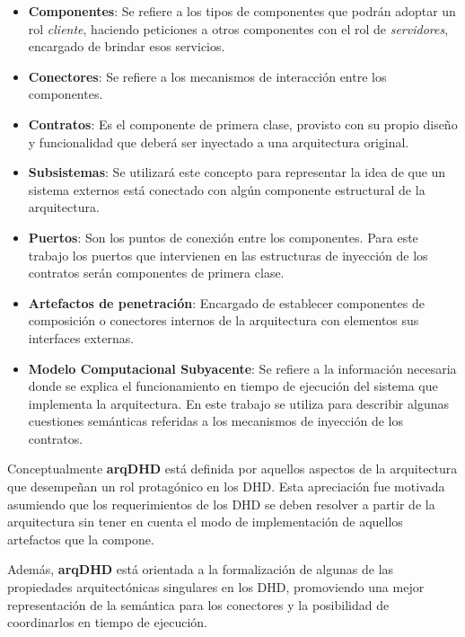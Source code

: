 \begin{itemize}
 
 \item \textbf{Componentes}: Se refiere a los tipos de componentes que podrán adoptar un rol 
 \textit{cliente}, haciendo peticiones a otros componentes con el rol de \textit{servidores}, encargado de brindar esos servicios. \label{lbl:componente} 
 
 
 \item \textbf{Conectores}: Se refiere a los mecanismos de interacción entre los componentes.
 
 \item \textbf{Contratos}: Es el componente de primera clase, provisto con su propio diseño y funcionalidad que deberá ser inyectado a una arquitectura original.
 
 \item \textbf{Subsistemas}: Se utilizará este concepto para representar la idea de que un sistema externos está conectado con algún componente estructural de la arquitectura. 
 
 \item \textbf{Puertos}:  Son los puntos de conexión entre los componentes. Para este trabajo los puertos que intervienen en las estructuras de inyección de los contratos serán componentes de primera clase.
  
 \item \textbf{Artefactos de penetración}: Encargado de establecer componentes de
composición  o conectores internos de la arquitectura con elementos sus
interfaces externas. 

 \item \textbf{Modelo Computacional Subyacente}: Se refiere a la información necesaria donde se explica el funcionamiento en tiempo de ejecución del sistema que implementa la arquitectura. En este trabajo se utiliza para describir algunas cuestiones semánticas referidas a los mecanismos de inyección de los contratos.


\end{itemize}

Conceptualmente \textbf{arqDHD} está definida por aquellos aspectos de la arquitectura que desempeñan un rol protagónico en los DHD. Esta apreciación fue motivada asumiendo que los requerimientos de los DHD se deben resolver a partir de la arquitectura sin tener en cuenta el modo de implementación de aquellos artefactos que la compone.

Además, \textbf{arqDHD} está orientada a la formalización de algunas de las propiedades arquitectónicas singulares en los DHD, promoviendo una mejor representación de la semántica para los conectores y la posibilidad de coordinarlos en tiempo de ejecución.


